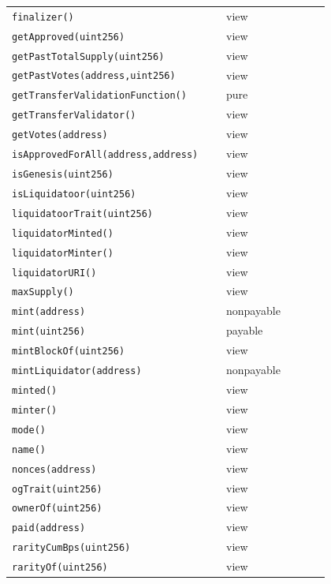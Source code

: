 \begin{longtable}{@{}p{0.62\linewidth}p{0.30\linewidth}@{}}
\texttt{\scriptsize finalizer()} & view \\
\texttt{\scriptsize getApproved(uint256)} & view \\
\texttt{\scriptsize getPastTotalSupply(uint256)} & view \\
\texttt{\scriptsize getPastVotes(address,uint256)} & view \\
\texttt{\scriptsize getTransferValidationFunction()} & pure \\
\texttt{\scriptsize getTransferValidator()} & view \\
\texttt{\scriptsize getVotes(address)} & view \\
\texttt{\scriptsize isApprovedForAll(address,address)} & view \\
\texttt{\scriptsize isGenesis(uint256)} & view \\
\texttt{\scriptsize isLiquidatoor(uint256)} & view \\
\texttt{\scriptsize liquidatoorTrait(uint256)} & view \\
\texttt{\scriptsize liquidatorMinted()} & view \\
\texttt{\scriptsize liquidatorMinter()} & view \\
\texttt{\scriptsize liquidatorURI()} & view \\
\texttt{\scriptsize maxSupply()} & view \\
\texttt{\scriptsize mint(address)} & nonpayable \\
\texttt{\scriptsize mint(uint256)} & payable \\
\texttt{\scriptsize mintBlockOf(uint256)} & view \\
\texttt{\scriptsize mintLiquidator(address)} & nonpayable \\
\texttt{\scriptsize minted()} & view \\
\texttt{\scriptsize minter()} & view \\
\texttt{\scriptsize mode()} & view \\
\texttt{\scriptsize name()} & view \\
\texttt{\scriptsize nonces(address)} & view \\
\texttt{\scriptsize ogTrait(uint256)} & view \\
\texttt{\scriptsize ownerOf(uint256)} & view \\
\texttt{\scriptsize paid(address)} & view \\
\texttt{\scriptsize rarityCumBps(uint256)} & view \\
\texttt{\scriptsize rarityOf(uint256)} & view \\

\end{longtable}
